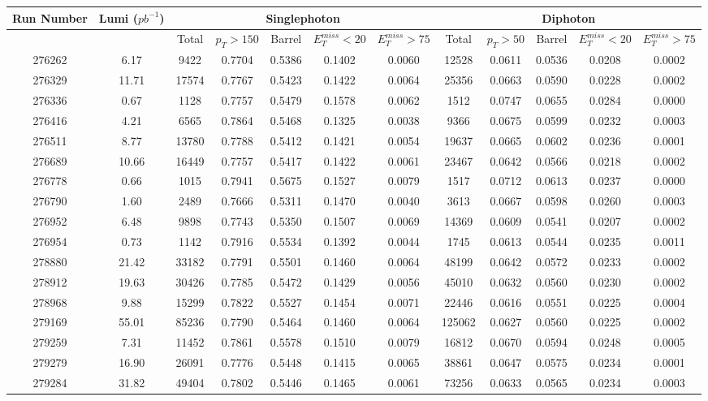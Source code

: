\documentclass[10pt]{extarticle}
\begin{document}
\begin{longtable}{|c|c|c|c|c|c|c|c|c|c|c|c|}
\hline 
Run Number & Lumi ($pb^{-1}$) & \multicolumn{5}{|c|}{Singlephoton} & \multicolumn{5}{|c|}{Diphoton} \\ 
\hline 
 & & Total & $p_{T} > 150$ & Barrel & $E_{T}^{miss} < 20$ & $E_{T}^{miss} > 75$ & Total & $p_{T} > 50$ & Barrel & $E_{T}^{miss} < 20$ & $E_{T}^{miss} > 75$ \\ 
\hline 
276262&6.17&9422&0.7704&0.5386&0.1402&0.0060&12528&0.0611&0.0536&0.0208&0.0002 \\ 
\hline 
276329&11.71&17574&0.7767&0.5423&0.1422&0.0064&25356&0.0663&0.0590&0.0228&0.0002 \\ 
\hline 
276336&0.67&1128&0.7757&0.5479&0.1578&0.0062&1512&0.0747&0.0655&0.0284&0.0000 \\ 
\hline 
276416&4.21&6565&0.7864&0.5468&0.1325&0.0038&9366&0.0675&0.0599&0.0232&0.0003 \\ 
\hline 
276511&8.77&13780&0.7788&0.5412&0.1421&0.0054&19637&0.0665&0.0602&0.0236&0.0001 \\ 
\hline 
276689&10.66&16449&0.7757&0.5417&0.1422&0.0061&23467&0.0642&0.0566&0.0218&0.0002 \\ 
\hline 
276778&0.66&1015&0.7941&0.5675&0.1527&0.0079&1517&0.0712&0.0613&0.0237&0.0000 \\ 
\hline 
276790&1.60&2489&0.7666&0.5311&0.1470&0.0040&3613&0.0667&0.0598&0.0260&0.0003 \\ 
\hline 
276952&6.48&9898&0.7743&0.5350&0.1507&0.0069&14369&0.0609&0.0541&0.0207&0.0002 \\ 
\hline 
276954&0.73&1142&0.7916&0.5534&0.1392&0.0044&1745&0.0613&0.0544&0.0235&0.0011 \\ 
\hline 
278880&21.42&33182&0.7791&0.5501&0.1460&0.0064&48199&0.0642&0.0572&0.0233&0.0002 \\ 
\hline 
278912&19.63&30426&0.7785&0.5472&0.1429&0.0056&45010&0.0632&0.0560&0.0230&0.0002 \\ 
\hline 
278968&9.88&15299&0.7822&0.5527&0.1454&0.0071&22446&0.0616&0.0551&0.0225&0.0004 \\ 
\hline 
279169&55.01&85236&0.7790&0.5464&0.1460&0.0064&125062&0.0627&0.0560&0.0225&0.0002 \\ 
\hline 
279259&7.31&11452&0.7861&0.5578&0.1510&0.0079&16812&0.0670&0.0594&0.0248&0.0005 \\ 
\hline 
279279&16.90&26091&0.7776&0.5448&0.1415&0.0065&38861&0.0647&0.0575&0.0234&0.0001 \\ 
\hline 
279284&31.82&49404&0.7802&0.5446&0.1465&0.0061&73256&0.0633&0.0565&0.0234&0.0003 \\ 

\end{longtable}
\end{document}
